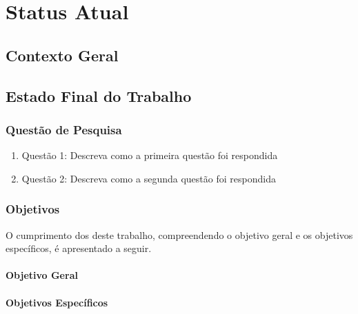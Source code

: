\chapter{Status Atual}
\label{cap-status-atual}


\section{Contexto Geral}
\label{contexto-geral}

\section{Estado Final do Trabalho}
\label{status-final}

\subsection{Questão de Pesquisa}
\label{status-pesquisa}

\begin{enumerate}
\item Questão 1: Descreva como a primeira questão foi respondida
\item Questão 2: Descreva como a segunda questão foi respondida
\end{enumerate}

\subsection{Objetivos}
\label{status-objetivos}

O cumprimento dos  deste trabalho, compreendendo o objetivo geral e os objetivos específicos, é apresentado a seguir.

\subsubsection{Objetivo Geral}
\label{status-objetivo-geral}

\subsubsection{Objetivos Específicos}
\label{status-objetivo-especificos}

